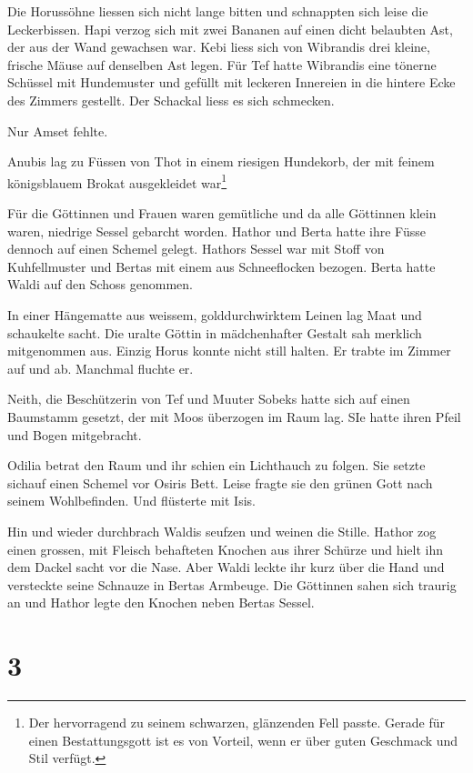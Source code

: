 Die Horussöhne liessen sich nicht lange bitten und schnappten sich leise die Leckerbissen. Hapi verzog sich mit zwei Bananen auf einen dicht belaubten Ast, der aus der Wand gewachsen war. Kebi liess sich von Wibrandis drei kleine, frische Mäuse auf denselben Ast legen. Für  Tef hatte Wibrandis eine tönerne Schüssel mit Hundemuster und gefüllt mit leckeren Innereien in die hintere Ecke des Zimmers gestellt. Der Schackal liess es sich schmecken.

Nur Amset fehlte.

Anubis lag zu Füssen von Thot in einem riesigen Hundekorb, der mit feinem königsblauem Brokat ausgekleidet war\footnote{Der hervorragend zu seinem schwarzen, glänzenden Fell passte. Gerade für einen Bestattungsgott ist es von Vorteil, wenn er über guten Geschmack und Stil verfügt.}

Für die Göttinnen und Frauen waren gemütliche und da alle Göttinnen klein waren, niedrige Sessel gebarcht worden. Hathor und Berta hatte ihre Füsse dennoch auf einen Schemel gelegt. Hathors Sessel war mit Stoff von  Kuhfellmuster und Bertas mit einem aus Schneeflocken bezogen. Berta hatte Waldi auf den Schoss genommen.

In einer Hängematte aus weissem, golddurchwirktem Leinen lag Maat und schaukelte sacht. Die uralte Göttin in mädchenhafter Gestalt sah merklich mitgenommen aus. Einzig Horus konnte nicht still halten. Er trabte im Zimmer auf und ab. Manchmal fluchte er.

Neith, die Beschützerin von Tef und Muuter Sobeks hatte sich auf einen Baumstamm gesetzt, der mit Moos überzogen im Raum lag. SIe hatte ihren Pfeil und Bogen mitgebracht.

Odilia betrat den Raum und ihr schien ein Lichthauch zu folgen. Sie setzte sichauf einen Schemel vor Osiris Bett. Leise fragte sie den grünen Gott nach seinem Wohlbefinden. Und flüsterte mit Isis.

Hin und wieder durchbrach Waldis seufzen und weinen die Stille. Hathor zog einen grossen, mit Fleisch behafteten Knochen aus ihrer Schürze und hielt ihn dem Dackel sacht vor die Nase. Aber Waldi leckte ihr kurz über die Hand und versteckte seine Schnauze in Bertas Armbeuge. Die Göttinnen sahen sich traurig an und Hathor legte den Knochen neben Bertas Sessel.


\section*{3}

